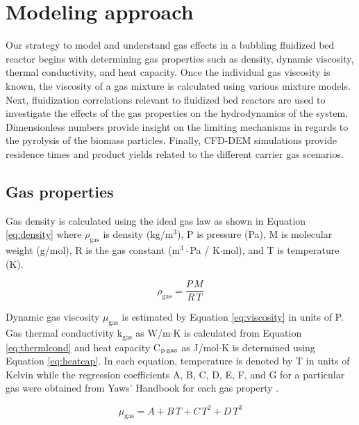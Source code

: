 
\section{Modeling approach}

Our strategy to model and understand gas effects in a bubbling fluidized bed reactor begins with determining gas properties such as density, dynamic viscosity, thermal conductivity, and heat capacity. Once the individual gas viscosity is known, the viscosity of a gas mixture is calculated using various mixture models. Next, fluidization correlations relevant to fluidized bed reactors are used to investigate the effects of the gas properties on the hydrodynamics of the system. Dimensionless numbers provide insight on the limiting mechanisms in regards to the pyrolysis of the biomass particles. Finally, CFD-DEM simulations provide residence times and product yields related to the different carrier gas scenarios.


\subsection{Gas properties}

Gas density is calculated using the ideal gas law as shown in Equation \ref{eq:density} where $\rho_\text{gas}$ is density (kg/m$^3$), P is pressure (Pa), M is molecular weight (g/mol), R is the gas constant (m$^3\cdot$Pa / K$\cdot$mol), and T is temperature (K).

\begin{equation}\label{eq:density}
    \rho_\text{gas} = \frac{P\,M}{R\,T}
\end{equation}

Dynamic gas viscosity $\mu_\text{gas}$ is estimated by Equation \ref{eq:viscosity} in units of \textmugreek P. Gas thermal conductivity k$_\text{gas}$ as W/m$\cdot$K is calculated from Equation \ref{eq:thermlcond} and heat capacity C$_\text{p\,gas}$ as J/mol$\cdot$K is determined using Equation \ref{eq:heatcap}. In each equation, temperature is denoted by T in units of Kelvin while the regression coefficients A, B, C, D, E, F, and G for a particular gas were obtained from Yaws' Handbook for each gas property \cite{Yaws2014}.

\begin{equation}\label{eq:viscosity}
    \mu_\text{gas} = A + B\,T + C\,T^2 + D\,T^3
\end{equation}

